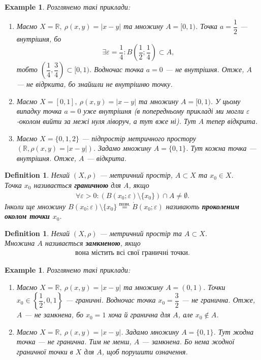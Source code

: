 \documentclass[a4paper, 10pt]{article}
\theoremstyle{theoremdd}
\theoremstyle{theoremdd}
\newtheorem{definition}[theorem]{Definition}
\theoremstyle{theoremdd}
\theoremstyle{theoremdd}
\newtheorem{example}[theorem]{Example}
\theoremstyle{theoremdd}
\theoremstyle{theoremdd}
\theoremstyle{theoremdd}
\theoremstyle{theoremdd}
\begin{document}
\begin{example} 
Розглянемо такі приклади:
\begin{enumerate}[wide=0pt,label={\arabic*)}]
\item Маємо $X = \mathbb{R},\ \rho(x,y) = |x-y|$ та множину $A = [0,1)$. Точка $a = \dfrac{1}{2}$ --- внутрішня, бо 
\[
\exists \varepsilon = \dfrac{1}{4}: B\left(\dfrac{1}{2}; \dfrac{1}{4} \right) \subset A,
\]
тобто $\left( \dfrac{1}{4}, \dfrac{3}{4} \right) \subset [0,1)$. Водночас точка $a = 0$ --- не внутрішня. Отже, $A$ --- не відркита, бо знайшли не внутрішню точку.

\item Маємо $X = [0,1],\ \rho(x,y) = |x-y|$ та множину $A = [0,1)$. У цьому випадку точка $a = 0$ уже внутрішня (в попередньому прикладі ми могли $\varepsilon$-околом вийти за межі нуля ліворуч, а тут вже ні). Тут $A$ тепер відкрита.

\item Маємо $X = \{0,1,2\}$ --- підпростір метричного простору $(\mathbb{R}, \rho(x,y) = |x-y|)$. Задамо множину $A = \{0,1\}$. Тут кожна точка --- внутрішня. Отже, $A$ --- відкрита.
\end{enumerate}
\end{example}

\begin{definition}
Нехай $(X,\rho)$ --- метричний простір, $A \subset X$ та $x_0 \in X$.\\
Точка $x_0$ називається \textbf{граничною} для $A$, якщо
\begin{align*}
\forall \varepsilon > 0: (B(x_0;\varepsilon) \setminus \{x_0\}) \cap A \neq \emptyset.
\end{align*}
Інколи ще множину $B(x_0;\varepsilon) \setminus \{x_0\} \overset{\text{позн.}}{=} \mathring{B}(x_0;\varepsilon)$ називають \textbf{проколеним околом точки $x_0$}.
\end{definition}

\begin{definition}
Нехай $(X,\rho)$ --- метричний простір та $A \subset X$.\\
Множина $A$ називається \textbf{замкненою}, якщо
\begin{align*}
\text{вона містить всі свої граничні точки.}
\end{align*}
\end{definition}

\begin{example}
Розглянемо такі приклади:
\begin{enumerate}[wide=0pt,label={\arabic*)}]
\item Маємо $X = \mathbb{R},\ \rho(x,y) = |x-y|$ та множину $A = (0,1)$. Точки $x_0 \in \left\{\dfrac{1}{2}, 0, 1\right\}$ --- граничні. Водночас точка $x_0 = \dfrac{3}{2}$ --- не гранична. Отже, $A$ --- не замкнена, бо $x_0 = 1$ хоча й гранична для $A$, але $x_0 \notin A$.

\item Маємо $X = \mathbb{R},\ \rho(x,y) = |x-y|$. Задамо множину $A = \{0,1 \}$. Тут жодна точка --- не гранична. Тим не менш, $A$ --- замкнена. Бо нема жодної граничної точки в $X$ для $A$, щоб порушити означення.
\end{enumerate}
\end{example}
\end{document}
